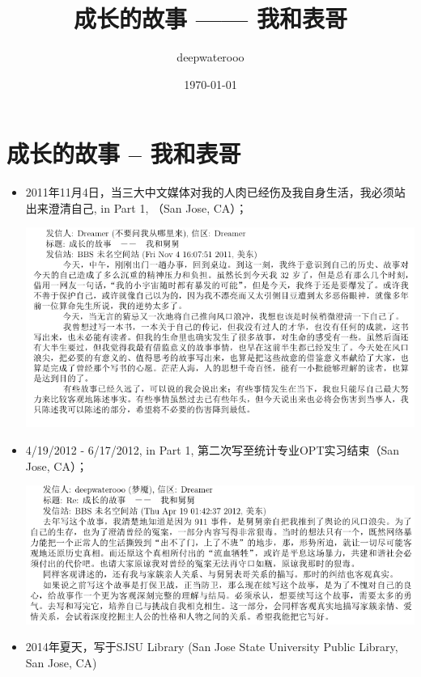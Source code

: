 \documentclass[9pt, b5paper]{article}
\author{deepwaterooo}
\date{\today}
\title{成长的故事 —— 我和表哥}
\begin{document}
\maketitle
\tableofcontents


\section{成长的故事 -- 我和表哥}
\label{sec:orgdd287db}
\begin{itemize}
\item 2011年11月4日，当三大中文媒体对我的人肉已经伤及我自身生活，我必须站出来澄清自己, in Part 1, （San Jose, CA）；

\begin{center}
\includegraphics[width=.9\linewidth]{./pic/dreamer1.png}
\end{center}
\item 4/19/2012 - 6/17/2012, in Part 1, 第二次写至统计专业OPT实习结束（San Jose, CA）；

\begin{center}
\includegraphics[width=.9\linewidth]{./pic/dreamer2.png}
\end{center}
\item 2014年夏天，写于SJSU Library (San Jose State University Public Library, San Jose, CA)


\end{itemize}
\end{document}
